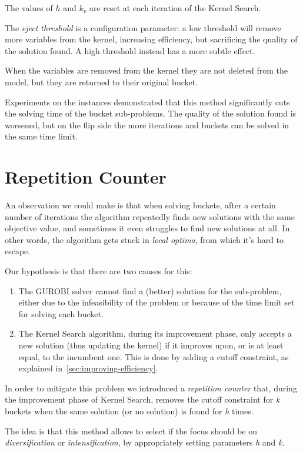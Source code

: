 The values of \(h\) and \(k_{v}\) are reset at each iteration of the Kernel Search.

The \textit{eject threshold} is a configuration parameter:
a low threshold will remove more variables from the kernel, increasing efficiency,
but sacrificing the quality of the solution found.
A high threshold instead has a more subtle effect.

When the variables are removed from the kernel they are not deleted from the model,
but they are returned to their original bucket.

Experiments on the instances demonstrated that this method significantly cuts
the solving time of the bucket sub-problems.
The quality of the solution found is worsened, but on the flip side
the more iterations and buckets can be solved in the same time limit.


\section{Repetition Counter}
An observation we could make is that when solving buckets,
after a certain number of iterations the algorithm
repeatedly finds new solutions with the same objective value,
and sometimes it even struggles to find new solutions at all.
In other words, the algorithm gets stuck in \textit{local optima},
from which it's hard to escape.

Our hypothesis is that there are two causes for this:
\begin{enumerate}
    \item The GUROBI solver cannot find a (better) solution for the sub-problem,
    either due to the infeasibility of the problem or because of
    the time limit set for solving each bucket.
    \item The Kernel Search algorithm, during its improvement phase,
    only accepts a new solution (thus updating the kernel)
    if it improves upon, or is at least equal, to the incumbent one.
    This is done by adding a cutoff constraint, as explained in~\ref{sec:improving-efficiency}.
\end{enumerate}

In order to mitigate this problem we introduced a \textit{repetition counter}
that, during the improvement phase of Kernel Search,
removes the cutoff constraint for \textit{k} buckets
when the same solution (or no solution) is found for \textit{h} times.

The idea is that this method allows to select if the focus should be on
\textit{diversification} or \textit{intensification},
by appropriately setting parameters \textit{h} and \textit{k}.

